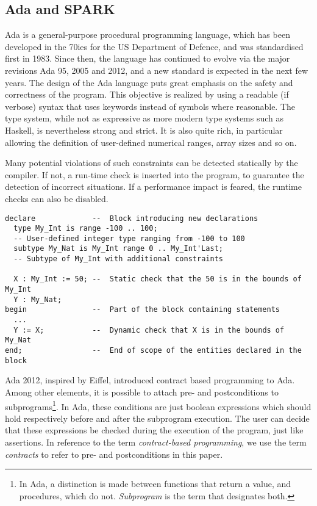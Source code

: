 \documentclass[runningheads]{llncs}
\begin{document}
\subsection{Ada and SPARK}
Ada is a general-purpose procedural programming language, which has been developed in the 70ies for the US Department of Defence, and was standardised first in 1983. Since then, the language has continued to evolve via the major revisions Ada 95, 2005 and 2012, and a new standard is expected in the next few years. The design of the Ada language puts great emphasis on the safety and correctness of the program. This objective is realized by using a readable (if verbose) syntax that uses keywords instead of symbols where reasonable. The type system, while not as expressive as more modern type systems such as Haskell, is nevertheless strong and strict. It is also quite rich, in particular allowing the definition of user-defined numerical ranges, array sizes and so on.

Many potential violations of such constraints can be detected statically by the compiler. If not, a run-time check is inserted into the program, to guarantee the detection of incorrect situations. If a performance impact is feared, the runtime checks can also be disabled.
\begin{lstlisting}
declare             --  Block introducing new declarations
  type My_Int is range -100 .. 100;
  -- User-defined integer type ranging from -100 to 100
  subtype My_Nat is My_Int range 0 .. My_Int'Last;
  -- Subtype of My_Int with additional constraints
  
  X : My_Int := 50; --  Static check that the 50 is in the bounds of My_Int
  Y : My_Nat;
begin               --  Part of the block containing statements
  ...
  Y := X;           --  Dynamic check that X is in the bounds of My_Nat
end;                --  End of scope of the entities declared in the block
\end{lstlisting}
Ada 2012, inspired by Eiffel, introduced contract based programming to Ada. Among other elements, it is possible to attach pre- and postconditions to subprograms\footnote{In Ada, a distinction is made between functions that return a value, and procedures, which do not. \emph{Subprogram} is the term that designates both.}. In Ada, these conditions are just boolean expressions which should hold respectively before and after the subprogram execution. The user can decide that these expressions be checked during the execution of the program, just like assertions. In reference to the term \emph{contract-based programming}, we use the term \emph{contracts} to refer to pre- and postconditions in this paper.
\end{document}
